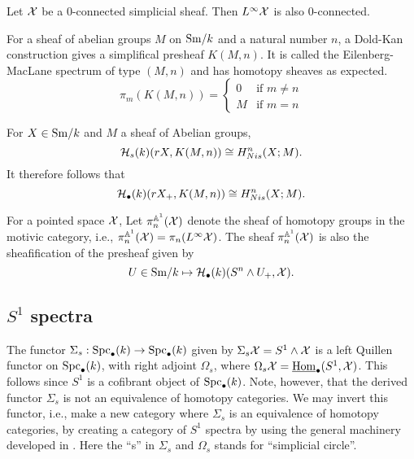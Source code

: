 \documentclass{amsart}%
\begin{document}
\begin{proposition}
  Let $\mathcal{X}$ be a $0$-connected simplicial sheaf. Then
  $L^{\infty}\mathcal{X}$ is also $0$-connected.
\end{proposition}

For a sheaf of abelian groups $M$ on $\mathrm{Sm}/k$ and a natural number $n$,
a Dold-Kan construction gives a simplifical presheaf $K(M,n)$. It is
called the Eilenberg-MacLane spectrum of type $(M,n)$ and has homotopy
sheaves as expected.
\begin{equation*}
  \pi_m(K(M,n)) = \begin{cases}0 & \text{if }m\neq n \\ M & \text{if } m = n \end{cases}
\end{equation*}

\begin{proposition}
  For $X\in\mathrm{Sm}/k$ and $M$ a sheaf of Abelian groups,
\begin{equation*}
  \mathcal{H}_s(k)(rX, K(M,n)) \cong H^n_{Nis}(X; M).
\end{equation*}
It therefore follows that
\begin{equation*}
  \mathcal{H}_{\bullet}(k)(rX_+, K(M,n)) \cong H^n_{Nis}(X; M).
\end{equation*}
\end{proposition}

\begin{notation}

  For a pointed space $\mathcal{X}$, Let $\pi_n^{\mathbb{A}^1}(\mathcal{X})$ denote the
  sheaf of homotopy groups in the motivic category, i.e.,
  $\pi^{\mathbb{A}^1}_n(\mathcal{X}) = \pi_n(L^{\infty}\mathcal{X})$.  The sheaf
  $\pi^{\mathbb{A}^1}_n(\mathcal{X})$ is also the sheafification of the presheaf
  given by
  \begin{equation*}
    U \in \mathrm{Sm}/k \mapsto \mathcal{H}_{\bullet}(k)(S^n\wedge U_+, \mathcal{X}).
  \end{equation*}
\end{notation}

\subsection{$S^1$ spectra}

The functor $\Sigma_s : \mathrm{Spc}_{\bullet}(k) \to \mathrm{Spc}_{\bullet}(k)$ given
by $\Sigma_s \mathcal{X} = S^1 \wedge \mathcal{X}$ is a left Quillen functor on
$\mathrm{Spc}_{\bullet}(k)$, with right adjoint $\Omega_s$, where
$\Omega_s\mathcal{X} = \underline{\operatorname{Hom}}_{\bullet}(S^1,\mathcal{X})$. This follows
since $S^1$ is a cofibrant object of $\mathrm{Spc}_{\bullet}(k)$. Note,
however, that the derived functor $\Sigma_s$ is not an equivalence of
homotopy categories. We may invert this functor, i.e., make a new
category where $\Sigma_s$ is an equivalence of homotopy categories, by
creating a category of $S^1$ spectra by using the general machinery
developed in \cite{H-Spt}. Here the ``s'' in $\Sigma_s$ and $\Omega_s$
stands for ``simplicial circle''.
\end{document}
